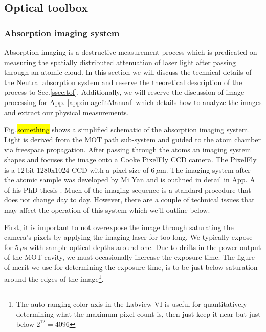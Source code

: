 \subsection{Optical toolbox} \label{ssec:op_tools}
\subsubsection{Absorption imaging system}
Absorption imaging is a destructive measurement process which is predicated on measuring the spatially distributed attenuation of laser light after passing through an atomic cloud. 
In this section we will discuss the technical details of the Neutral absorption system and reserve the theoretical description of the process to Sec.\ref{ssec:tof}.
Additionally, we will reserve the discussion of image processing for App. \ref{app:imagefitManual} which details how to analyze the images and extract our physical measurements.

Fig.\,\hl{something} shows a simplified schematic of the absorption imaging system.
Light is derived from the MOT path sub-system and guided to the atom chamber via freespace propagation. 
After passing through the atoms an imaging system shapes and focuses the image onto a Cooke PixelFly CCD camera.
The PixelFly is a 12\,bit 1280x1024 CCD with a pixel size of 6\,$\mu$m.
The imaging system after the atomic sample was developed by Mi Yan and is outlined in detail in App. A of his PhD thesis \cite{Yan2013d}. 
Much of the imaging sequence is a standard procedure that does not change day to day.
However, there are a couple of technical issues that may affect the operation of this system which we'll outline below.

First, it is important to not overexpose the image through saturating the camera's pixels by applying the imaging laser for too long.
We typically expose for 5\,$\mu$s with sample optical depths around one.
Due to drifts in the power output of the MOT cavity, we must occasionally increase the exposure time.
The figure of merit we use for determining the exposure time, is to be just below saturation around the edges of the image\footnote{The auto-ranging color axis in the Labview VI is useful for quantitatively determining what the maximum pixel count is, then just keep it near but just below $2^{12}=4096$}.

